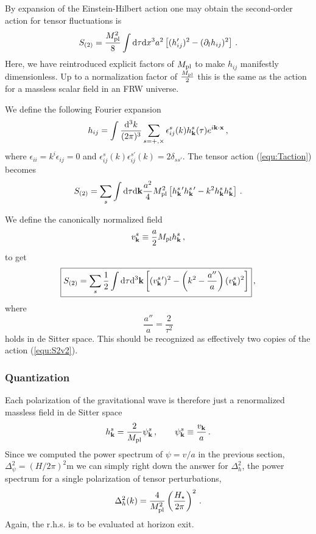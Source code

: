 \documentclass[12pt,letterpaper,rotate]{article}
\def\beq{\begin{equation}}
\def\eeq{\end{equation}}
\def\Mp{M_{\rm pl}}
\def\d{{\rm d}}
\begin{document}
{By expansion of the Einstein-Hilbert action one may obtain
the second-order action for tensor fluctuations is
\beq
\label{equ:Taction}
S_{(2)} = \frac{\Mp^2}{8} \int \d \tau \d x^3 a^2  \left[  (h_{ij}')^2 - (\partial_l h_{ij})^2 \right]\, .
\eeq
Here, we have reintroduced explicit factors of $\Mp$ to make $h_{ij}$ manifestly dimensionless.
Up to a normalization factor of $ \frac{\Mp}{2}$ this is the same as the action for a massless scalar field in an FRW universe.

We define the following Fourier expansion
\beq
 h_{ij} = \int \frac{\d^3 k}{(2\pi)^3} \sum_{s=+,\times} \epsilon^s_{ij}(k) h^s_{\bf k}(\tau) e^{i {\bf k} \cdot {\bf x}}\, ,
\eeq
where $\epsilon_{ii} = k^i \epsilon_{ij} = 0$ and $\epsilon^s_{ij}(k) \epsilon^{s'}_{ij}(k) = 2 \delta_{s s'}$.
The tensor action (\ref{equ:Taction}) becomes
\beq
S_{(2)} = \sum_s \int \d \tau \d {\bf k} \frac{a^2}{4} \Mp^2 \left[ h_{\bf k}^s{}' h_{\bf k}^s{}' - k^2 h_{\bf k}^s h_{\bf k}^s\right]\, .
\eeq

We define the canonically normalized field
\beq
v_{\bf k}^s \equiv \frac{a}{2} \Mp h_{\bf k}^s\, ,
\eeq
to get
\beq
\label{equ:S2v3}
\fbox{$\displaystyle
S_{(2)} = \sum_s \frac{1}{2} \int \d \tau \d^3 {\bf k}  \left[ (v^s_{\bf k}{}')^2   - \left( k^2 - \frac{a''}{a} \right) (v_{\bf k}^s)^2\right] $}\, ,
\eeq
where
\beq
\frac{a''}{a} = \frac{2}{\tau^2}
\eeq
holds in de Sitter space.
This should be recognized as effectively
two copies of the action (\ref{equ:S2v2}).

\subsubsection{Quantization}

Each polarization of the gravitational wave is therefore just a renormalized massless field in de Sitter space
\beq
h_{\bf k}^s = \frac{2}{\Mp} \psi^s_{\bf k}\, , \qquad \psi_{\bf k}^s \equiv \frac{v_{\bf k}}{a}\, .
\eeq
Since we computed the power spectrum of $\psi = v/a$ in the previous section, $\Delta_\psi^2 = (H/2\pi)^2$m we can simply right down the answer for $\Delta_h^2$, the power spectrum for a single polarization of tensor perturbations, 
\beq
\Delta_h^2(k) = \frac{4}{\Mp^2} \left( \frac{H_\star}{2\pi}\right)^2\, .
\eeq
Again, the r.h.s. is to be evaluated at horizon exit.



}
\end{document}
